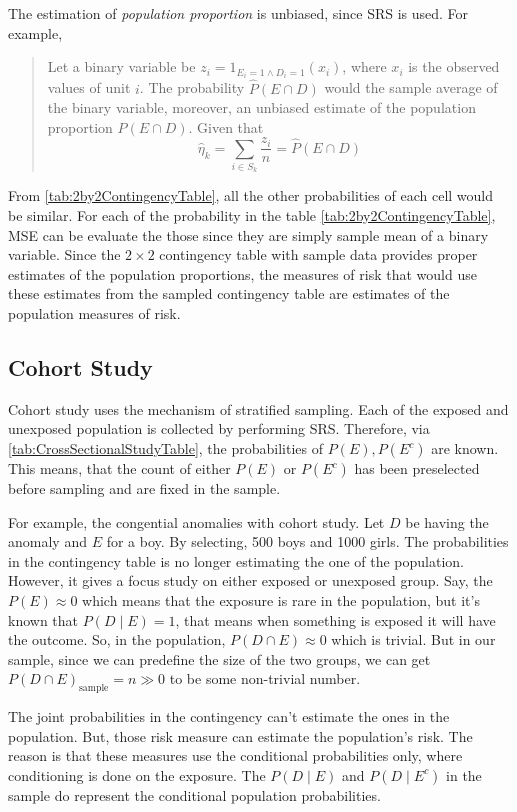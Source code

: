 The estimation of \emph{population proportion} is unbiased, since SRS is used. For example,
\begin{quote}
    Let a binary variable be $z_i=1_{E_i=1\wedge D_i=1}(x_i)$, where $x_i$ is the observed values of unit $i$. The probability $\hat{P}(E\cap D)$ would the sample average of the binary variable, moreover, an unbiased estimate of the population 
    proportion $P(E\cap D)$. Given that 
    \begin{equation*}
        \hat{\eta}_k=\sum_{i\in S_k}\frac{z_i}{n}=\hat{P}(E\cap D)
    \end{equation*}
\end{quote}
From \cref{tab:2by2ContingencyTable}, all the other probabilities of each cell would be similar. For each of the probability in the table \cref{tab:2by2ContingencyTable}, MSE can be evaluate the those since they are simply sample mean of a 
binary variable. Since the $2\times 2$ contingency table with sample data provides proper estimates of the population proportions, the measures of risk that would use these estimates from the sampled contingency table are estimates of the 
population measures of risk. 

\subsection{Cohort Study}
Cohort study uses the mechanism of stratified sampling. Each of the exposed and unexposed population is collected by performing SRS. Therefore, via \cref{tab:CrossSectionalStudyTable}, the probabilities of $P(E),P(E^c)$ are known. This means, that the count of either $P(E)$ or $P(E^c)$ has been 
preselected before sampling and are fixed in the sample.

For example, the congential anomalies with cohort study. Let $D$ be having the anomaly and $E$ for a boy. By selecting, 500 boys and 1000 girls. The probabilities in the contingency table is no longer estimating the one of the population. 
However, it gives a focus study on either exposed or unexposed group. Say, the $P(E)\approx0$  which means that the exposure is rare in the population, but it's known that $P(D\mid E)=1$, that means when something is exposed it will have the 
outcome. So, in the population, $P(D\cap E)\approx0$ which is trivial. But in our sample, since we can predefine the size of the two groups, we can get $P(D\cap E)_{\mathrm{sample}}=n\gg 0$ to be some non-trivial number.

The joint probabilities in the contingency can't estimate the ones in the population. But, those risk measure can estimate the population's risk. The reason is that these measures use the conditional probabilities only, where conditioning is 
done on the exposure. The $P(D\mid E)$ and $P(D\mid E^c)$ in the sample do represent the conditional population probabilities.

